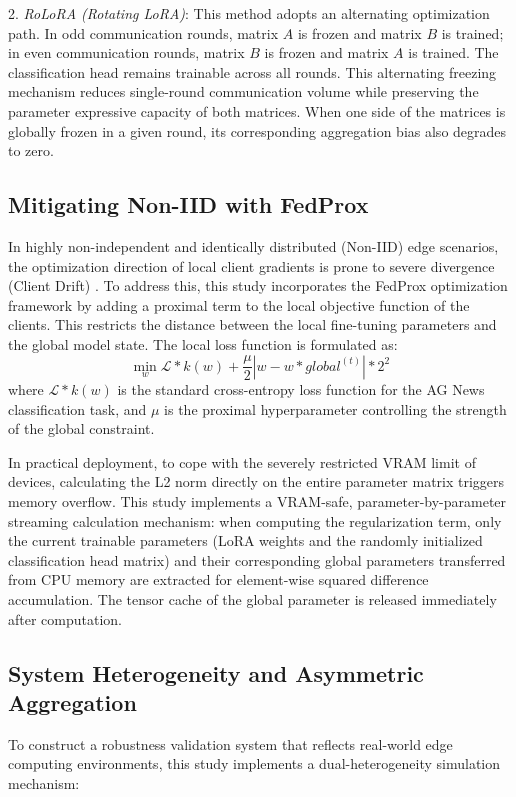 \documentclass[journal]{IEEEtran}
\begin{document}
2. \textit{RoLoRA (Rotating LoRA)}: This method adopts an alternating optimization path. In odd communication rounds, matrix $A$ is frozen and matrix $B$ is trained; in even communication rounds, matrix $B$ is frozen and matrix $A$ is trained. The classification head remains trainable across all rounds. This alternating freezing mechanism reduces single-round communication volume while preserving the parameter expressive capacity of both matrices. When one side of the matrices is globally frozen in a given round, its corresponding aggregation bias also degrades to zero.

\subsection{Mitigating Non-IID with FedProx}
In highly non-independent and identically distributed (Non-IID) edge scenarios, the optimization direction of local client gradients is prone to severe divergence (Client Drift) \cite{zhao2018federated}. To address this, this study incorporates the FedProx optimization framework \cite{li2020federated} by adding a proximal term to the local objective function of the clients. This restricts the distance between the local fine-tuning parameters and the global model state. The local loss function is formulated as:
\begin{equation}
\min_{w} \mathcal{L}*{k}(w) + \frac{\mu}{2} |w - w*{global}^{(t)}|*2^2
\end{equation}
where $\mathcal{L}*{k}(w)$ is the standard cross-entropy loss function for the AG News classification task, and $\mu$ is the proximal hyperparameter controlling the strength of the global constraint.

In practical deployment, to cope with the severely restricted VRAM limit of devices, calculating the L2 norm directly on the entire parameter matrix triggers memory overflow. This study implements a VRAM-safe, parameter-by-parameter streaming calculation mechanism: when computing the regularization term, only the current trainable parameters (LoRA weights and the randomly initialized classification head matrix) and their corresponding global parameters transferred from CPU memory are extracted for element-wise squared difference accumulation. The tensor cache of the global parameter is released immediately after computation.

\subsection{System Heterogeneity and Asymmetric Aggregation}
To construct a robustness validation system that reflects real-world edge computing environments, this study implements a dual-heterogeneity simulation mechanism:
\end{document}
